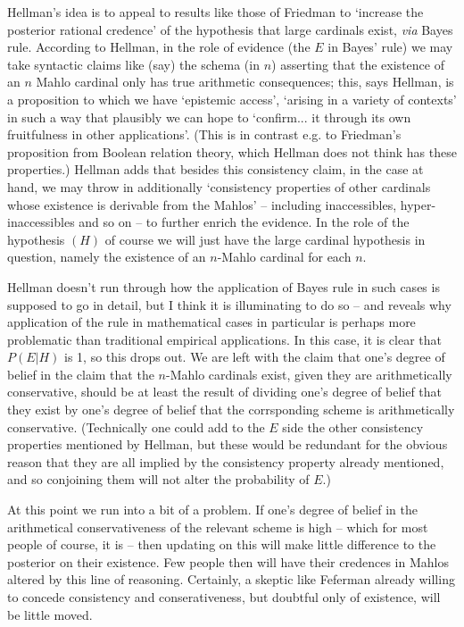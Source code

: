 \documentclass{amsart}
\theoremstyle{definition}
\begin{document}
Hellman's idea is to appeal to results like those of Friedman 
to `increase the posterior rational credence' of the hypothesis that large 
cardinals exist, \emph{via}  Bayes rule. According to Hellman, 
in the role of evidence (the $E$ in Bayes' rule) we may take syntactic 
claims like (say) the schema (in $n$) asserting that the existence of an $n$ Mahlo cardinal
only has true arithmetic consequences; this, says Hellman, is a proposition to which 
we have `epistemic access', `arising in a variety of contexts' in such a way that
plausibly we can hope to `confirm... it through its own fruitfulness in other applications'.
(This is in contrast e.g. to Friedman's proposition from Boolean relation theory,
which Hellman does not think has these properties.) Hellman adds that besides this
consistency claim, in the case at hand, we may throw in additionally `consistency 
properties of other cardinals whose existence is derivable from the Mahlos' -- 
including inaccessibles, hyper-inaccessibles and so on -- 
to further enrich the evidence. In the role of the hypothesis $(H)$ of course
we will just have the large cardinal hypothesis in question, namely 
the existence of an $n$-Mahlo cardinal for each $n$. 

Hellman doesn't run through how the application of Bayes rule in 
such cases is supposed to go in detail, but I think it is illuminating to do so 
-- and reveals why application of the rule in mathematical cases in particular 
is perhaps more problematic than traditional empirical applications. 
In this case, it is clear that $P(E|H)$ is 1, so this drops out. 
We are left with the claim that one's degree of belief in the claim that 
the $n$-Mahlo cardinals exist, given they are arithmetically conservative, should be at least 
the result of dividing one's degree of belief that they exist by 
one's degree of belief that the corrsponding scheme is arithmetically conservative. (Technically
one could add to the $E$ side the other consistency properties mentioned by Hellman,
but these would be redundant for the obvious reason that they are all implied by 
the consistency property already mentioned, and so conjoining them
will not alter the probability of $E$.)

At this point we run into a bit of a problem. If one's degree of belief 
in the arithmetical conservativeness of the relevant scheme is high -- which for most people 
of course, it is -- then updating on this will make little difference to the 
posterior on their existence. Few people then will have their credences in 
Mahlos altered by this line of reasoning. Certainly, a skeptic like Feferman already
willing to concede consistency and conserativeness, 
but doubtful only of existence, will be little moved.
\end{document}
